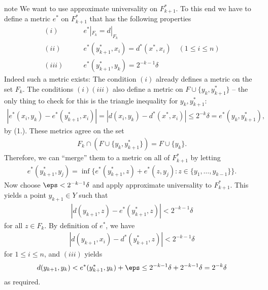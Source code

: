\documentclass[letterpaper,10pt,english]{jupyterBook}
\begin{document}
\begin{sphinxadmonition}{note}
\sphinxAtStartPar
We want to use approximate universality on \(F^*_{k+1}\). To this end we have to define a metric \(e^*\) on \(F^*_{k+1}\) that has the following properties
\begin{align*}
	(i) 	\qquad	& e^*|_{F_k} = d|_{F_k} \\
	(ii)  	\qquad & e^*(y^*_{k+1},x_i) = d^*(x^*,x_i) \quad (1 \leq i \leq n) \\
	(iii)	\qquad 	& e^*(y^*_{k+1}, y_k) = 2^{-k-1}\delta 
\end{align*}
\sphinxAtStartPar
Indeed such a metric exists: The condition \((i)\) already defines a metric on the set \(F_k\). The conditions \((i)\)\sphinxhyphen{}\((iii)\) also define a metric on \(F \cup \{y_k,y^*_{k+1}\}\) – the only thing to check for this is the triangle inequality for \(y_k, y^*_{k+1}\):
\begin{equation*}
\begin{split}
	|e^*(x_i,y_k) - e^*(y^*_{k+1},x_i)| = |d(x_i,y_k) - d^*(x^*,x_i) | \leq 2^{-k}\delta = e^*(y_k, y^*_{k+1}),
\end{split}
\end{equation*}
\sphinxAtStartPar
by (1.). These metrics agree on the set
\begin{equation*}
\begin{split}
	F_k \cap (F \cup \{y_k,y^*_{k+1}\}) = F \cup \{y_k\}.
\end{split}
\end{equation*}
\sphinxAtStartPar
Therefore, we can “merge” them to a metric on all of \(F^*_{k+1}\) by letting
\begin{equation*}
\begin{split}
	e^*(y^*_{k+1}, y_j) = \inf \{e^*(y^*_{k+1}, z) + e^*(z,y_j) \colon z \in \{y_1, \dots, y_{k-1}\} \}.	
\end{split}
\end{equation*}
\sphinxAtStartPar
Now choose \(\eps < 2^{-k-1}\delta\) and apply approximate universality to \(F^*_{k+1}\). This yields a point \(y_{k+1} \in Y\) such that
\begin{equation*}
\begin{split}
	|d(y_{k+1}, z)  - e^*(y^*_{k+1}, z) | < 2^{-k-1}\delta
\end{split}
\end{equation*}
\sphinxAtStartPar
for all \(z \in F_k\). By definition of \(e^*\), we have
\begin{equation*}
\begin{split}
	|d(y_{k+1}, x_i)  - d^*(y^*_{k+1}, z) | < 2^{-k-1}\delta 
\end{split}
\end{equation*}
\sphinxAtStartPar
for \(1 \leq i \leq n\), and \((iii)\) yields
\begin{equation*}
\begin{split}
	d(y_{k+1}, y_k) < e^*(y^*_{k+1},y_k) + \eps \leq 2^{-k-1}\delta + 2^{-k-1}\delta = 2^{-k}\delta
\end{split}
\end{equation*}
\sphinxAtStartPar
as required.
\end{sphinxadmonition}
\end{document}
